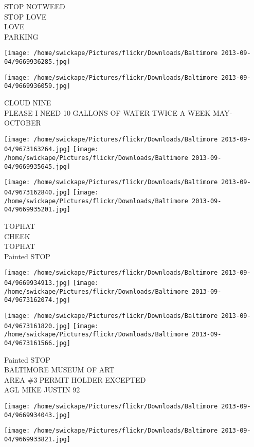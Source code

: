 \documentclass[10pt,letterpaper]{article}
\begin{document}
STOP NOTWEED\\
STOP LOVE\\
LOVE\\
PARKING
\pagebreak

\texttt{[image: /home/swickape/Pictures/flickr/Downloads/Baltimore 2013-09-04/9669936285.jpg]}

\vspace{0.25in}
\texttt{[image: /home/swickape/Pictures/flickr/Downloads/Baltimore 2013-09-04/9669936059.jpg]}

CLOUD NINE\\
PLEASE I NEED 10 GALLONS OF WATER TWICE A WEEK MAY{-}OCTOBER
\pagebreak

\texttt{[image: /home/swickape/Pictures/flickr/Downloads/Baltimore 2013-09-04/9673163264.jpg]}
\texttt{[image: /home/swickape/Pictures/flickr/Downloads/Baltimore 2013-09-04/9669935645.jpg]}

\texttt{[image: /home/swickape/Pictures/flickr/Downloads/Baltimore 2013-09-04/9673162840.jpg]}
\texttt{[image: /home/swickape/Pictures/flickr/Downloads/Baltimore 2013-09-04/9669935201.jpg]}

TOPHAT\\
CHEEK\\
TOPHAT\\
Painted STOP
\pagebreak

\texttt{[image: /home/swickape/Pictures/flickr/Downloads/Baltimore 2013-09-04/9669934913.jpg]}
\texttt{[image: /home/swickape/Pictures/flickr/Downloads/Baltimore 2013-09-04/9673162074.jpg]}

\texttt{[image: /home/swickape/Pictures/flickr/Downloads/Baltimore 2013-09-04/9673161820.jpg]}
\texttt{[image: /home/swickape/Pictures/flickr/Downloads/Baltimore 2013-09-04/9673161566.jpg]}

Painted STOP\\
BALTIMORE MUSEUM OF ART\\
AREA \#3 PERMIT HOLDER EXCEPTED\\
AGL MIKE JUSTIN 92
\pagebreak

\texttt{[image: /home/swickape/Pictures/flickr/Downloads/Baltimore 2013-09-04/9669934043.jpg]}

\vspace{0.25in}
\texttt{[image: /home/swickape/Pictures/flickr/Downloads/Baltimore 2013-09-04/9669933821.jpg]}
\end{document}
